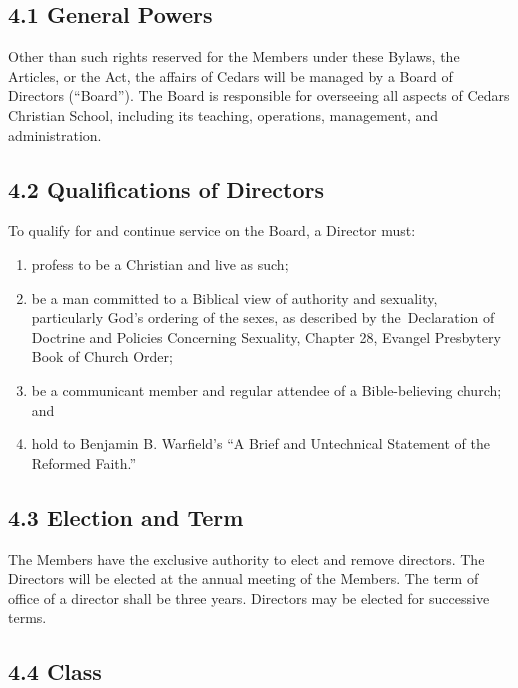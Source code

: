 \documentclass[
]{book}
\begin{document}
\subsection*{4.1 General Powers}\label{general-powers}

Other than such rights reserved for the Members under these Bylaws, the Articles, or the Act, the affairs of Cedars will be managed by a Board of Directors (``Board''). The Board is responsible for overseeing all aspects of Cedars Christian School, including its teaching, operations, management, and administration.

\subsection*{4.2 Qualifications of Directors}\label{qualifications-of-directors}

To qualify for and continue service on the Board, a Director must:

\begin{enumerate}
\def\labelenumi{\alph{enumi}.}
\item
  profess to be a Christian and live as such;
\item
  be a man committed to a Biblical view of authority and sexuality, particularly God's ordering of the sexes, as described by the~Declaration of Doctrine and Policies Concerning Sexuality, Chapter 28, Evangel Presbytery Book of Church Order;
\item
  be a communicant member and regular attendee of a Bible-believing church; and
\item
  hold to Benjamin B. Warfield's ``A Brief and Untechnical Statement of the Reformed Faith.''
\end{enumerate}

\subsection*{4.3 Election and Term}\label{election-and-term}

The Members have the exclusive authority to elect and remove directors. The Directors will be elected at the annual meeting of the Members. The term of office of a director shall be three years. Directors may be elected for successive terms.

\subsection*{4.4 Class}\label{class}
\end{document}
